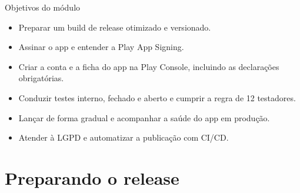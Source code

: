 \documentclass[aspectratio=169,10pt]{beamer}
\begin{document}
\capa

\begin{frame}{Objetivos do módulo}
  \begin{conceito}
    \begin{itemize}
      \item Preparar um build de release otimizado e versionado.
      \item Assinar o app e entender a Play App Signing.
      \item Criar a conta e a ficha do app na Play Console, incluindo as declarações obrigatórias.
      \item Conduzir testes interno, fechado e aberto e cumprir a regra de 12 testadores.
      \item Lançar de forma gradual e acompanhar a saúde do app em produção.
      \item Atender à LGPD e automatizar a publicação com CI/CD.
    \end{itemize}
  \end{conceito}
\end{frame}

\sumario



\section{Preparando o release}
\end{document}
